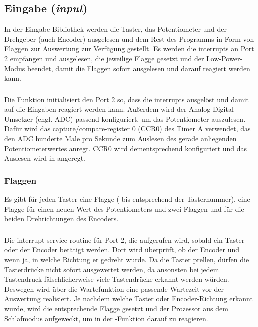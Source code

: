 \subsection{Eingabe (\emph{input})}
In der Eingabe-Bibliothek werden die Taster, das Potentiometer und der Drehgeber (auch Encoder) ausgelesen und dem Rest des Programms in Form von Flaggen zur Auswertung zur Verfügung gestellt. Es werden die interrupts an Port 2 empfangen und ausgelesen, die jeweilige Flagge gesetzt und der Low-Power-Modus beendet, damit die Flaggen sofort ausgelesen und darauf reagiert werden kann.

\subsubsection{}
Die Funktion initialisiert den Port 2 so, dass die interrupts ausgelöst und damit auf die Eingaben reagiert werden kann. Außerdem wird der Analog-Digital-Umsetzer (engl. ADC) passend konfiguriert, um das Potentiometer auszulesen. Dafür wird das capture/compare-register 0 (CCR0) des Timer A verwendet, das den ADC hunderte Male pro Sekunde zum Auslesen des gerade anliegenden Potentiometerwertes anregt. CCR0 wird dementsprechend konfiguriert und das Auslesen wird in  angeregt.

\subsubsection{Flaggen}
Es gibt für jeden Taster eine Flagge ( bis  entsprechend der Tasternummer), eine Flagge  für einen neuen Wert des Potentiometers und zwei Flaggen  und  für die beiden Drehrichtungen des Encoders.

\subsubsection{}
Die interrupt service routine für Port 2, die aufgerufen wird, sobald ein Taster oder der Encoder betätigt werden. Dort wird überprüft, ob der Encoder und wenn ja, in welche Richtung er gedreht wurde. Da die Taster prellen, dürfen die Tasterdrücke nicht sofort ausgewertet werden, da ansonsten bei jedem Tastendruck fälschlicherweise viele Tastendrücke erkannt werden würden. Deswegen wird über die Wartefunktion  eine passende Wartezeit vor der Auswertung realisiert. Je nachdem welche Taster oder Encoder-Richtung erkannt wurde, wird die entsprechende Flagge gesetzt und der Prozessor aus dem Schlafmodus aufgeweckt, um in der -Funktion darauf zu reagieren.

